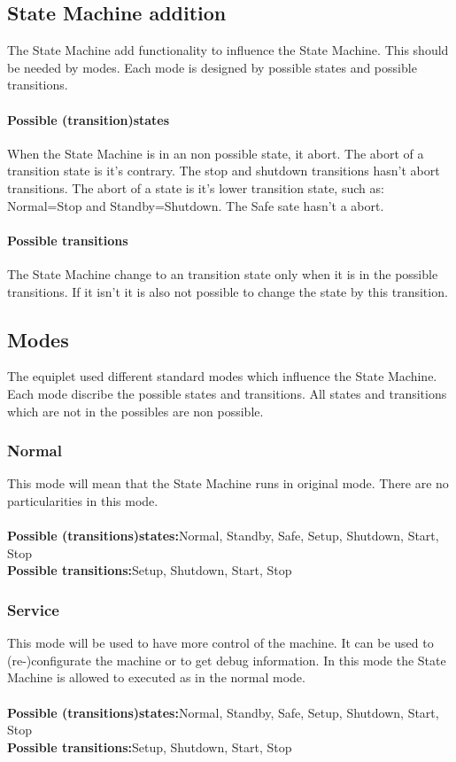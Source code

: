 \documentclass[12pt,a4paper]{report}
\begin{document}
\subsection{State Machine addition}
The State Machine add functionality to influence the State Machine. This should be needed by modes. Each mode is designed by possible states and possible transitions.
\paragraph{Possible (transition)states}When the State Machine is in an non possible state, it abort. The abort of a transition state is it's contrary. The stop and shutdown transitions hasn't abort transitions. The abort of a state is it's lower transition state, such as: Normal=Stop and Standby=Shutdown. The Safe sate hasn't a abort.
\paragraph{Possible transitions}The State Machine change to an transition state only when it is in the possible transitions. If it isn't it is also not possible to change the state by this transition.

\subsection{Modes}
The equiplet used different standard modes which influence the State Machine. Each mode discribe the possible states and transitions. All states and transitions which are not in the possibles are non possible. 

\subsubsection{Normal}This mode will mean that the State Machine runs in original mode. There are no particularities in this mode.\\\\
\textbf{Possible (transitions)states:}Normal, Standby, Safe, Setup, Shutdown, Start, Stop\\
\textbf{Possible transitions:}Setup, Shutdown, Start, Stop

\subsubsection{Service}This mode will be used to have more control of the machine. It can be used to (re-)configurate the machine or to get debug information. In this mode the State Machine is allowed to executed as in the normal mode.\\\\
\textbf{Possible (transitions)states:}Normal, Standby, Safe, Setup, Shutdown, Start, Stop\\
\textbf{Possible transitions:}Setup, Shutdown, Start, Stop
\end{document}
